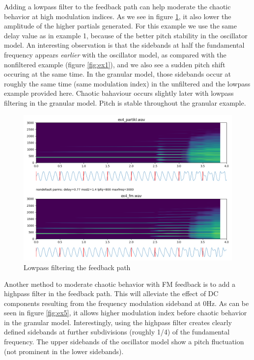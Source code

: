 \documentclass[runningheads,a4paper]{llncs}
\begin{document}
Adding a lowpass filter to the feedback path can help moderate the chaotic behavior at high modulation indices. As we see in figure \ref{fig:ex4}, it also lower the amplitude of the higher partials generated. For this example we use the same delay value as in example 1, because of the better pitch stability in the oscillator model.  An interesting observation is that the sidebands at half the fundamental frequency appears \emph{earlier} with the oscillator model, as compared with the nonfiltered example (figure \ref{fig:ex1}), and we also see a sudden pitch shift occuring at the same time. In the granular model, those sidebands occur at roughly the same time (same modulation index) in the unfiltered and the lowpass example provided here. Chaotic bahaviour occurs slightly later with lowpass filtering in the granular model. Pitch is stable throughout the granular example.

\begin{figure}[h]
	\centering
	\includegraphics[width=.95\textwidth]{ex4_compare.png}
	\caption{Lowpass filtering the feedback path}
	\label{fig:ex4}
\end{figure}

Another method to moderate chaotic behavior with FM feedback is to add a highpass filter in the feedback path. This will alleviate the effect of DC components resulting from the frequency modulation sideband at 0Hz.  As can be seen in figure \ref{fig:ex5},  it allows higher modulation index before chaotic behavior in the granular model. Interestingly, using the highpass filter creates clearly defined sidebands at further subdivisions (roughly 1/4) of the fundamental frequency. The upper sidebands of the oscillator model show a pitch fluctuation (not prominent in the lower sidebands).
\end{document}
